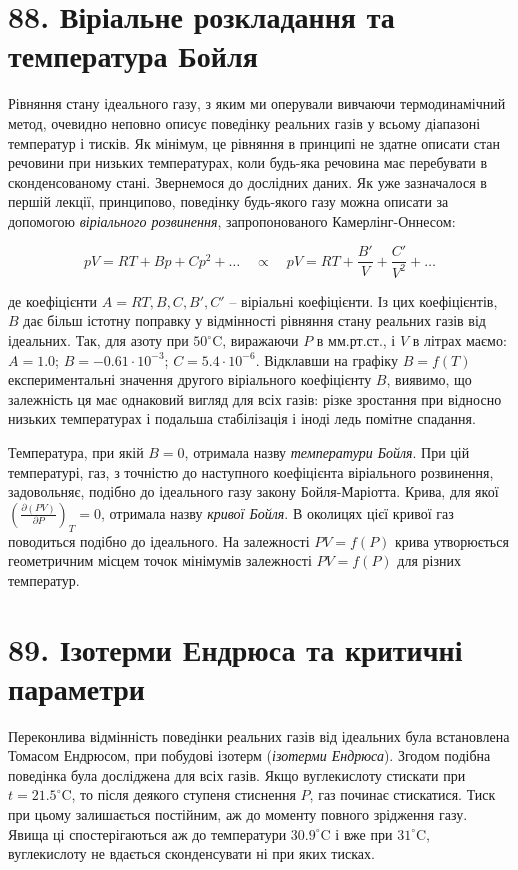 \documentclass{article}
\begin{document}
\section*{88. Віріальне розкладання та температура Бойля}

Рівняння стану ідеального газу, з яким ми оперували вивчаючи термодинамічний метод, очевидно неповно
описує поведінку реальних газів у всьому діапазоні температур і тисків. Як мінімум, це рівняння в
принципі не здатне описати стан речовини при низьких температурах, коли будь-яка речовина має
перебувати в сконденсованому стані. Звернемося до дослідних даних. Як уже зазначалося в першій лекції,
принципово, поведінку будь-якого газу можна описати за допомогою \emph{віріального розвинення},
запропонованого Камерлінг-Оннесом:

\begin{equation}
pV = RT + Bp + Cp^{2} + \ldots \quad \propto \quad pV = RT + \frac{B'}{V} + \frac{C'}{V^{2}} + \ldots
\label{eq:88.1}
\end{equation}

де коефіцієнти $A=RT, B, C, B', C'$ -- віріальні коефіцієнти. Із цих коефіцієнтів, $B$ дає більш
істотну поправку у відмінності рівняння стану реальних газів від ідеальних. Так, для азоту при
$50^\circ\mathrm{C}$, виражаючи $P$ в мм.рт.ст., і $V$ в літрах маємо: $A = 1.0$; $B = -0.61 \cdot
10^{-3}$; $C = 5.4 \cdot 10^{-6}$. Відклавши на графіку $B = f(T)$ експериментальні значення другого
віріального коефіцієнту $B$, виявимо, що залежність ця має однаковий вигляд для всіх газів: різке
зростання при відносно низьких температурах і подальша стабілізація і іноді ледь помітне спадання.

Температура, при якій $B = 0$, отримала назву \emph{температури Бойля}. При цій температурі, газ, з
точністю до наступного коефіцієнта віріального розвинення, задовольняє, подібно до ідеального газу
закону Бойля-Маріотта. Крива, для якої $\left(\frac{\partial(PV)}{\partial P}\right)_T = 0$, отримала
назву \emph{кривої Бойля}. В околицях цієї кривої газ поводиться подібно до ідеального. На залежності
$PV = f(P)$ крива утворюється геометричним місцем точок мінімумів залежності $PV = f(P)$ для різних
температур.

\section*{89. Ізотерми Ендрюса та критичні параметри}

Переконлива відмінність поведінки реальних газів від ідеальних була встановлена Томасом Ендрюсом, при
побудові ізотерм  (\emph{ізотерми Ендрюса}). Згодом подібна поведінка була досліджена для
всіх газів. Якщо вуглекислоту стискати при $t = 21.5^\circ\mathrm{C}$, то після деякого ступеня
стиснення $P$, газ починає стискатися. Тиск при цьому залишається постійним, аж до моменту повного
зрідження газу. Явища ці спостерігаються аж до температури $30.9^\circ\mathrm{C}$ і вже при
$31^\circ\mathrm{C}$, вуглекислоту не вдається сконденсувати ні при яких тисках.
\end{document}
